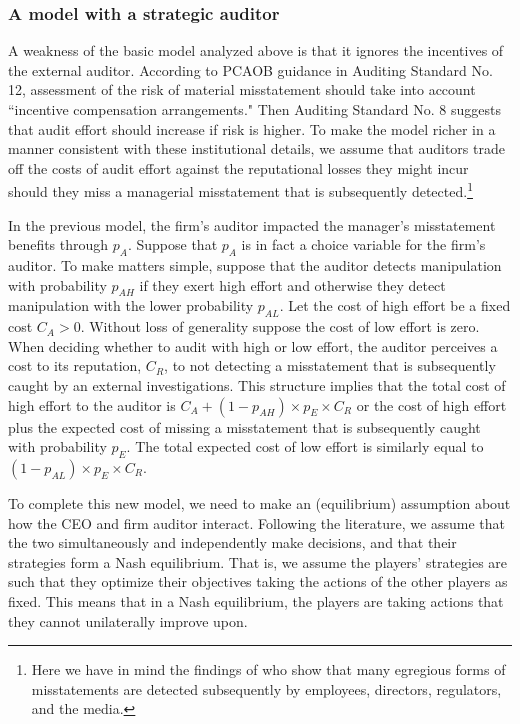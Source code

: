 \subsubsection{A model with a strategic auditor}
A weakness of the basic model analyzed above is that it ignores the incentives of the  external auditor.
According to PCAOB guidance in Auditing Standard No. 12, assessment of the risk of material misstatement should take into account ``incentive compensation arrangements."
Then Auditing Standard No. 8 suggests that audit effort should increase if risk is higher.
To make the model richer in a manner consistent with these institutional details, we assume that auditors trade off the costs of audit effort against the reputational losses they might incur should they miss a managerial misstatement that is subsequently detected.\footnote{
Here we have in mind the findings of \citet{Dyck:2010kh} who show that many egregious forms of misstatements are detected subsequently by employees, directors, regulators, and the media.} 

In the previous model, the firm's auditor impacted the manager's misstatement benefits through $p_A$. 
Suppose that $p_A$ is in fact a choice variable for the firm's auditor. 
To make matters simple, suppose that the auditor detects manipulation with probability $p_{AH}$ if they exert high effort and  otherwise they detect manipulation with the lower probability $p_{AL}$. 
Let the cost of high effort be a fixed cost $C_A > 0$. 
Without loss of generality suppose the cost of low effort is zero. 
When deciding whether to audit with high or low effort, the auditor perceives a cost to its reputation, $C_R$, to not detecting a misstatement that is subsequently caught by an external investigations. 
This structure implies that the total cost of high effort to the auditor is $C_A + (1-p_{AH}) \times p_E \times C_R$ or the cost of high effort plus the expected cost of missing a misstatement that is subsequently caught with probability $p_E$. 
The total expected cost of
low effort is similarly equal to $(1-p_{AL}) \times p_E \times C_R$. 

To complete this new model, we need to make an (equilibrium) assumption about how the CEO and firm auditor interact. 
Following the literature, we assume that the two simultaneously and independently make decisions, and that their strategies form a Nash equilibrium.
That is, we assume the players' strategies are such that they optimize their objectives  taking the actions of the other players as fixed. This means that in a Nash equilibrium, the players are taking actions that they cannot unilaterally improve upon.

